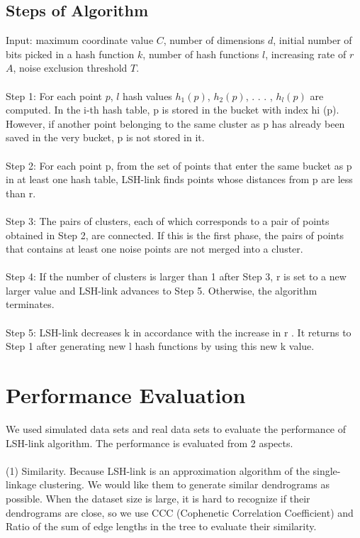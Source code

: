 \documentclass{report}
\begin{document}
\subsection*{Steps of Algorithm}
Input: maximum coordinate value $C$, number of dimensions $d$, initial number of bits picked in a hash function $k$, number of hash functions $l$, increasing rate of $r$ $A$, noise exclusion threshold $T$.\\\\
Step 1: For each point $p$, $l$ hash values $h_1(p)$, $h_2(p)$, . . . , $h_l(p)$ are computed.
In the i-th hash table, p is stored in the bucket with index hi (p). However, if
another point belonging to the same cluster as p has already been saved in the
very bucket, p is not stored in it.\\\\
Step 2: For each point p, from the set of points that enter the same bucket as p in
at least one hash table, LSH-link finds points whose distances from p are less
than r.\\\\
Step 3: The pairs of clusters, each of which corresponds to a pair of points obtained
in Step 2, are connected. If this is the first phase, the pairs of points that contains at least one noise points are not merged into a cluster.\\\\
Step 4: If the number of clusters is larger than 1 after Step 3, r is set to a new
larger value and LSH-link advances to Step 5. Otherwise, the algorithm terminates.\\\\
Step 5: LSH-link decreases k in accordance with the increase in r . It returns to
Step 1 after generating new l hash functions by using this new k value.

\section*{Performance Evaluation}
We used simulated data sets and real data sets to evaluate the performance of LSH-link algorithm. The performance is evaluated from 2 aspects.\\\\
\indent(1) Similarity. Because LSH-link is an approximation algorithm of the single-linkage clustering. We would like them to generate similar dendrograms as possible. When the dataset size is large, it is hard to recognize if their dendrograms are close, so we use CCC (Cophenetic Correlation Coefficient) and Ratio of the sum of edge lengths in the tree to evaluate their similarity.
\end{document}
